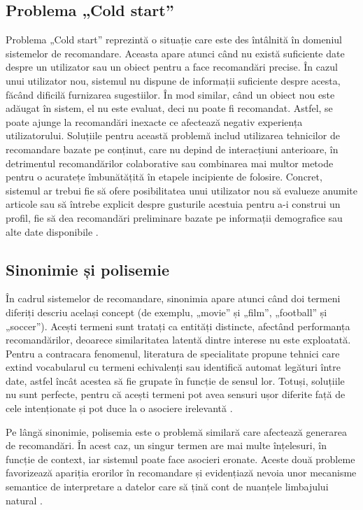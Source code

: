 \subsection{Problema „Cold start”}
\label{subsec:ch3sec4sub1}
Problema „Cold start” \cite{lika2014facing} reprezintă o situație care este des întâlnită în domeniul sistemelor de recomandare. 
Aceasta apare atunci când nu există suficiente date despre un utilizator sau un obiect pentru a face recomandări precise.
În cazul unui utilizator nou, sistemul nu dispune de informații suficiente despre acesta, făcând dificilă furnizarea sugestiilor.
În mod similar, când un obiect nou este adăugat în sistem, el nu este evaluat, deci nu poate fi recomandat.
Astfel, se poate ajunge la recomandări inexacte ce afectează negativ experiența utilizatorului.
Soluțiile pentru această problemă includ utilizarea tehnicilor de recomandare bazate pe conținut, care nu depind de interacțiuni anterioare, 
în detrimentul recomandărilor colaborative sau combinarea mai multor metode pentru o acuratețe îmbunătățită în etapele incipiente de folosire.
Concret, sistemul ar trebui fie să ofere posibilitatea unui utilizator nou să evalueze anumite articole sau să întrebe explicit despre gusturile acestuia pentru a-i construi un profil, 
fie să dea recomandări preliminare bazate pe informații demografice sau alte date disponibile \cite{kumar2018recommendation}.


\subsection{Sinonimie și polisemie}
\label{subsec:ch3sec4sub2}
În cadrul sistemelor de recomandare, sinonimia apare atunci când doi termeni diferiți descriu același concept (de exemplu, „movie” și „film”, „football” și „soccer”).
Acești termeni sunt tratați ca entități distincte, afectând performanța recomandărilor, deoarece similaritatea latentă dintre interese nu este exploatată.
Pentru a contracara fenomenul, literatura de specialitate propune tehnici care extind vocabularul cu termeni echivalenți sau identifică automat legături între date, astfel încât acestea să fie grupate în funcție de sensul lor.
Totuși, soluțiile nu sunt perfecte, pentru că acești termeni pot avea sensuri ușor diferite față de cele intenționate și pot duce la o asociere irelevantă \cite{mansur2017review}.
\par
Pe lângă sinonimie, polisemia este o problemă similară care afectează generarea de recomandări. În acest caz, un singur termen are mai multe înțelesuri, în funcție de context, iar sistemul poate face asocieri eronate.
Aceste două probleme favorizează apariția erorilor în recomandare și evidențiază nevoia unor mecanisme semantice de interpretare a datelor care să țină cont de nuanțele limbajului natural \cite{lops2011content}.

